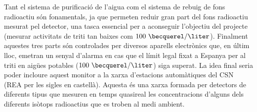 Tant el sistema de purificació de l'aigua com el sistema de rebuig de fons radioactiu són fonamentals, ja que permeten reduir gran part del fons radioactiu mesurat pel detector, una tasca essencial per a aconseguir l'objectiu del projecte (mesurar activitats de triti tan baixes com $100~\becquerel/\liter$). Finalment aquestes tres parts són controlades per diversos aparells electrònics que, en últim lloc, emetran un senyal d'alarma en cas que el límit legal fixat a Espanya per al triti en aigües potables ($100~\becquerel/\liter$) siga superat. La idea final seria poder incloure aquest monitor a la xarxa d'estacions automàtiques del CSN\cite{REA} (REA per les sigles en castellà). Aquesta és una xarxa formada per detectors de diferents tipus que mesuren en temps quasireal les concentracions d'alguns dels diferents isòtops radioactius que es troben al medi ambient. 